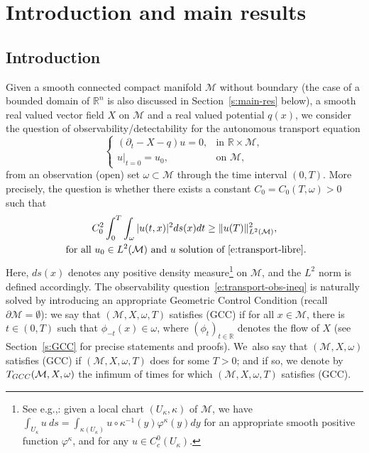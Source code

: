 \documentclass[11pt]{article}
\newcommand{\eg}{e.g.,\xspace}
\numberwithin{equation}{section}
\newcommand{\GCC}{\textup{GCC}}
\newcommand{\pGCC}{\textup{(GCC)}\xspace}
\theoremstyle{definition}
\newcommand{\M}{\ensuremath{\mathcal M}}
\newcommand{\mb}[1]{\ensuremath{\mathbb{#1}}}
\newcommand{\R}{{\mb{R}}}
\let\d\partial
\let\q q
\begin{document}
\section{Introduction and main results}

\subsection{Introduction}
\label{s:intro-intro}
Given a smooth connected compact manifold $\M$ without boundary (the case of a bounded domain of $\R^n$ is also discussed in Section~\ref{s:main-res} below), a smooth real valued vector field $X$ on $\M$ and a real valued potential $\q(x)$, we consider the question of observability/detectability for the autonomous transport equation
\begin{equation}
\label{e:transport-libre}
\begin{cases}
(\d_t - X-\q) u = 0, & \text{in } \R\times \M, \\
u|_{t=0} = u_0, & \text{on } \M,
\end{cases}
\end{equation}
from an observation (open) set $\omega \subset \M$ through the time interval $(0,T)$. More precisely, the question is whether there exists a constant $C_0=C_0(T,\omega)>0$ such that
\begin{multline}
\label{e:transport-obs-ineq}
C_0^2 \int_0^T\int_\omega |u(t,x)|^2 ds(x)dt \geq \|u (T)\|_{L^2(\M)}^2, \\
\text{ for all } u_0 \in L^2(\M) \text{ and } u \text{ solution of~\eqref{e:transport-libre}}.
\end{multline}
Here, $ds(x)$ denotes any positive density measure\footnote{See \eg \cite[Chap.\,16 p.\,427]{Lee:book}: given a local chart $(U_\kappa, \kappa)$ of $\M$, we have $\int_{U_\kappa} u \ ds= \int_{\kappa(U_\kappa)} u\circ \kappa^{-1}(y) \varphi^\kappa(y) dy$ for an appropriate smooth positive function $\varphi^\kappa$, and for any $u \in C^0_c(U_\kappa)$.} on $\M$, and the $L^2$ norm is defined accordingly.
The observability question~\eqref{e:transport-obs-ineq} is naturally solved by introducing an appropriate Geometric Control Condition (recall $\d\M=\emptyset$): we say that $(\M,X,\omega,T)$ satisfies \pGCC if for all $x\in \M$, there is $t \in (0,T)$ such that $\phi_{-t}(x)\in \omega$, where $(\phi_t)_{t\in\R}$ denotes the flow of $X$ (see Section~\ref{s:GCC} for precise statements and proofs). We~also say that $(\M,X,\omega)$ satisfies \pGCC if $(\M,X,\omega,T)$ does for some $T>0$; and if so, we denote by $T_{\GCC}(\M,X,\omega)$ the infimum of times for which $(\M,X,\omega,T)$ satisfies \pGCC.
\end{document}
